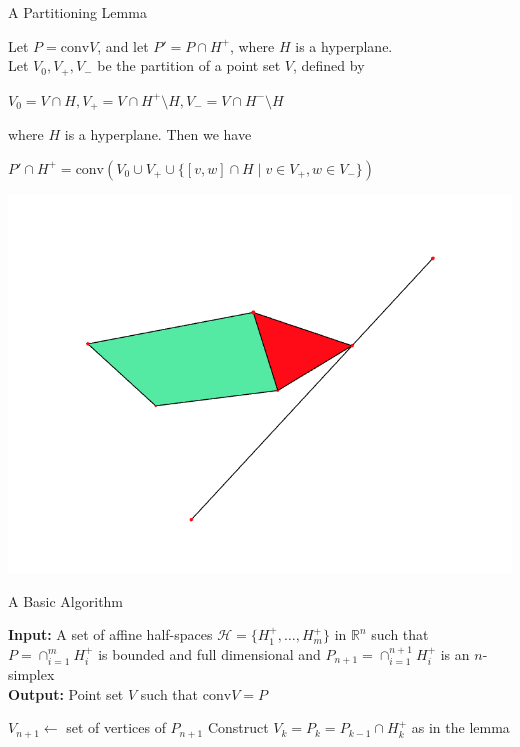 \documentclass[9pt]{beamer}
\newcommand\R{\mathbb{R}}
\newcommand\set[1]{\{#1\}}
\theoremstyle{definition}
\begin{document}
\begin{frame}[fragile]{A Partitioning Lemma}
  \begin{lemma}
    Let $P = \text{conv}V$, and let $P' = P \cap H^+$, where $H$ is a hyperplane. \\
    Let $V_0, V_+, V_-$ be the partition of a point set $V$, defined by
    \begin{center}
      $V_0 = V \cap H, V_+ = V \cap H^+ \setminus H, V_- = V \cap H^- \setminus H$
    \end{center}
    where $H$ is a hyperplane. Then we have
    \begin{center}
      $P' \cap H^+ =
      \text{conv}(V_0 \cup V_+ \cup \set{[v, w] \cap H \mid v \in V_+ , w \in V_-})$
      \end{center}
  \end{lemma}
    \begin{center}
    \includegraphics[width=.50\textwidth, height=0.4\textheight]{images/lemma}
  \end{center}
\end{frame}

\begin{frame}[fragile]{A Basic Algorithm }
  \begin{algorithm}[H]
    \textbf{Input:} A set of affine half-spaces $\mathcal{H} = \set{H_1^+, \dots, H_m^+}$
    in $\R^n$ such that $P = \cap_{i=1}^m H_i^+$ is bounded and full dimensional
    and $P_{n+1} = \cap_{i=1}^{n+1}H_i^+$ is an $n$-simplex\\
    \textbf{Output:} Point set $V$ such that $\text{conv}V = P$
    \begin{algorithmic}[1]
      \STATE $V_{n+1} \leftarrow$ set of vertices of $P_{n+1}$
      \STATE Construct $V_k = P_k = P_{k-1} \cap H_k^+$ as in the lemma
      \ENDFOR
    \end{algorithmic}
  \end{algorithm}
\end{frame}
\end{document}

